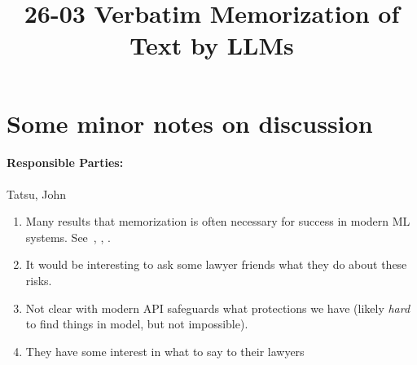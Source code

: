 \documentclass[11pt]{article}
\begin{document}
\title{26-03 Verbatim Memorization of Text by LLMs}

\maketitle

\section{Some minor notes on discussion}

\paragraph{Responsible Parties:} Tatsu, John

\begin{enumerate}[1.]
\item Many results that memorization is often necessary for
  success in modern ML systems.
  See~\citet{AttiasDzHaLiRo24},
  \citet{Feldman20},
  \citet{ChengDuKu22}.
\item It would be interesting to ask some lawyer friends what they
  do about these risks.
\item Not clear with modern API safeguards what protections we have (likely
  \emph{hard} to find things in model, but not impossible).
\item They have some interest in what to say to their lawyers
\end{enumerate}



\end{document}
